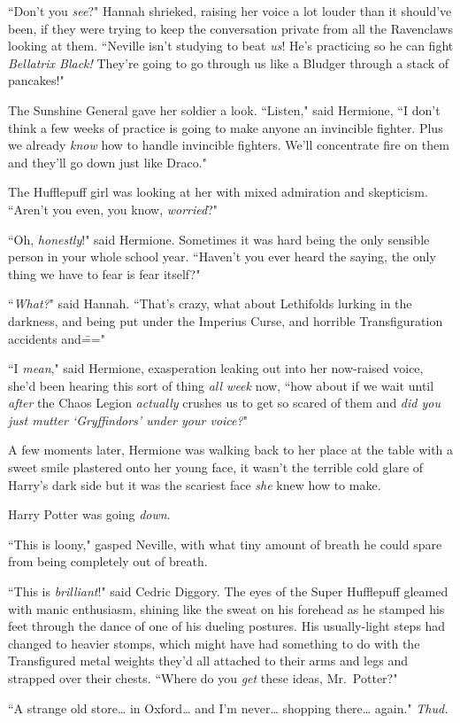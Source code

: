 ``Don't you \emph{see}?" Hannah shrieked, raising her voice a lot louder than it should've been, if they were trying to keep the conversation private from all the Ravenclaws looking at them. ``Neville isn't studying to beat \emph{us}! He's practicing so he can fight \emph{Bellatrix Black!} They're going to go through us like a Bludger through a stack of pancakes!"

The Sunshine General gave her soldier a look. ``Listen," said Hermione, ``I don't think a few weeks of practice is going to make anyone an invincible fighter. Plus we already \emph{know} how to handle invincible fighters. We'll concentrate fire on them and they'll go down just like Draco."

The Hufflepuff girl was looking at her with mixed admiration and skepticism. ``Aren't you even, you know, \emph{worried}?"

``Oh, \emph{honestly}!" said Hermione. Sometimes it was hard being the only sensible person in your whole school year. ``Haven't you ever heard the saying, the only thing we have to fear is fear itself?"

``\emph{What?}" said Hannah. ``That's crazy, what about Lethifolds lurking in the darkness, and being put under the Imperius Curse, and horrible Transfiguration accidents and\==="

``I \emph{mean}," said Hermione, exasperation leaking out into her now-raised voice, she'd been hearing this sort of thing \emph{all week} now, ``how about if we wait until \emph{after} the Chaos Legion \emph{actually} crushes us to get so scared of them and \emph{did you just mutter `Gryffindors' under your voice?}"

A few moments later, Hermione was walking back to her place at the table with a sweet smile plastered onto her young face, it wasn't the terrible cold glare of Harry's dark side but it was the scariest face \emph{she} knew how to make.

Harry Potter was going \emph{down}.

\later

``This is loony," gasped Neville, with what tiny amount of breath he could spare from being completely out of breath.

``This is \emph{brilliant}!" said Cedric Diggory. The eyes of the Super Hufflepuff gleamed with manic enthusiasm, shining like the sweat on his forehead as he stamped his feet through the dance of one of his dueling postures. His usually-light steps had changed to heavier stomps, which might have had something to do with the Transfigured metal weights they'd all attached to their arms and legs and strapped over their chests. ``Where do you \emph{get} these ideas, Mr.~Potter?"

``A strange old store{\ldots} in Oxford{\ldots} and I'm never{\ldots} shopping there{\ldots} again." \emph{Thud.}

